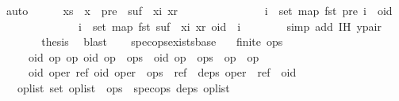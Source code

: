 \begin{isabellebody}
\ auto\isanewline
\ \ \ \ \isamarkupfalse%
\ {\isachardoublequoteopen}xs\ {\isacharat}\ {\isacharbrackleft}x{\isacharbrackright}\ {\isacharequal}\ pre\ {\isacharat}\ {\isacharparenleft}suf\ {\isacharat}\ {\isacharbrackleft}{\isacharparenleft}xi{\isacharcomma}\ xr{\isacharparenright}{\isacharbrackright}{\isacharparenright}\ {\isasymand}\isanewline
\ \ \ \ \ \ \ \ \ \ \ \ \ \ {\isacharparenleft}{\isasymforall}i\ {\isasymin}\ set\ {\isacharparenleft}map\ fst\ pre{\isacharparenright}{\isachardot}\ i\ {\isacharless}\ oid{\isacharparenright}\ {\isasymand}\isanewline
\ \ \ \ \ \ \ \ \ \ \ \ \ \ {\isacharparenleft}{\isasymforall}i\ {\isasymin}\ set\ {\isacharparenleft}map\ fst\ {\isacharparenleft}suf\ {\isacharat}\ {\isacharbrackleft}{\isacharparenleft}xi{\isacharcomma}\ xr{\isacharparenright}{\isacharbrackright}{\isacharparenright}{\isacharparenright}{\isachardot}\ oid\ {\isacharless}\ i{\isacharparenright}{\isachardoublequoteclose}\isanewline
\ \ \ \ \ \ \isamarkupfalse%
\ {\isacharparenleft}simp\ add{\isacharcolon}\ IH\ y{\isacharunderscore}pair{\isacharparenright}\isanewline
\ \ \ \ \isamarkupfalse%
\ \isamarkupfalse%
\ {\isacharquery}thesis\ \isamarkupfalse%
\ blast\isanewline
\ \ \isamarkupfalse%
\isanewline
{}\isamarkupfalse%
%
\endisatagproof
{\isafoldproof}%
%
\isadelimproof
\isanewline
%
\endisadelimproof
\isanewline
{}\isamarkupfalse%
\ spec{\isacharunderscore}ops{\isacharunderscore}exists{\isacharunderscore}base{\isacharcolon}\isanewline
\ \ \ {\isachardoublequoteopen}finite\ ops{\isachardoublequoteclose}\isanewline
\ \ \ \ \ {\isachardoublequoteopen}{\isasymAnd}oid\ op{}\ op{}{\isachardot}\ {\isacharparenleft}oid{\isacharcomma}\ op{}{\isacharparenright}\ {\isasymin}\ ops\ {\isasymLongrightarrow}\ {\isacharparenleft}oid{\isacharcomma}\ op{}{\isacharparenright}\ {\isasymin}\ ops\ {\isasymLongrightarrow}\ op{}\ {\isacharequal}\ op{}{\isachardoublequoteclose}\isanewline
\ \ \ \ \ {\isachardoublequoteopen}{\isasymAnd}oid\ oper\ ref{\isachardot}\ {\isacharparenleft}oid{\isacharcomma}\ oper{\isacharparenright}\ {\isasymin}\ ops\ {\isasymLongrightarrow}\ ref\ {\isasymin}\ deps\ oper\ {\isasymLongrightarrow}\ ref\ {\isacharless}\ oid{\isachardoublequoteclose}\isanewline
\ \ \ {\isachardoublequoteopen}{\isasymexists}op{\isacharunderscore}list{\isachardot}\ set\ op{\isacharunderscore}list\ {\isacharequal}\ ops\ {\isasymand}\ spec{\isacharunderscore}ops\ deps\ op{\isacharunderscore}list{\isachardoublequoteclose}\isanewline

\end{isabellebody}

